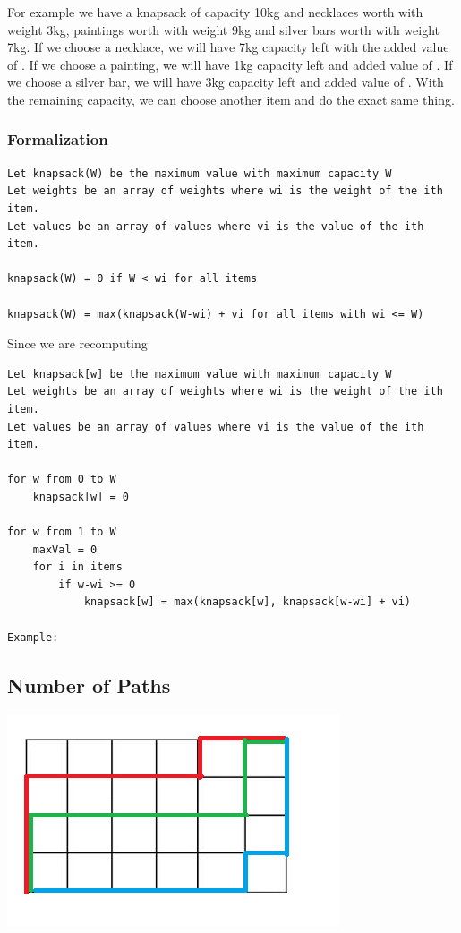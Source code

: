 \documentclass[11pt,oneside]{book}
\makeatletter
\def\maxwidth#1{\ifdim\Gin@nat@width>#1 #1\else\Gin@nat@width\fi}
\makeatother
\begin{document}
For example we have a knapsack of capacity 10kg and necklaces worth  with weight 3kg, paintings worth  with weight 9kg and silver bars worth  with weight 7kg. If we choose a necklace, we will have 7kg capacity left with the added value of . If we choose a painting, we will have 1kg capacity left and added value of . If we choose a silver bar, we will have 3kg capacity left and added value of . With the remaining capacity, we can choose another item and do the exact same thing.

\subsubsection{Formalization}

\begin{lstlisting}
Let knapsack(W) be the maximum value with maximum capacity W
Let weights be an array of weights where wi is the weight of the ith item.
Let values be an array of values where vi is the value of the ith item.

knapsack(W) = 0 if W < wi for all items

knapsack(W) = max(knapsack(W-wi) + vi for all items with wi <= W)
\end{lstlisting}

Since we are recomputing

\begin{lstlisting}
Let knapsack[w] be the maximum value with maximum capacity W
Let weights be an array of weights where wi is the weight of the ith item.
Let values be an array of values where vi is the value of the ith item.

for w from 0 to W
    knapsack[w] = 0

for w from 1 to W
    maxVal = 0
    for i in items
        if w-wi >= 0
            knapsack[w] = max(knapsack[w], knapsack[w-wi] + vi)

Example:

\end{lstlisting}

\subsection{Number of Paths}

\vspace{5px}\includegraphics[width=\maxwidth{\textwidth}]{recursion_grid.png}
\end{document}
